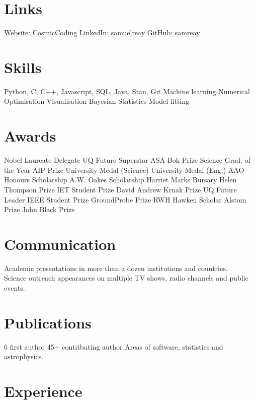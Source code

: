 \documentclass[]{friggeri-cv2}
\begin{document}
\pagestyle{plain}



\begin{aside}
\section{Links}
\href{https://cosmiccoding.com.au}{Website: CosmicCoding}
\href{https://www.linkedin.com/in/samuelreay/}{LinkedIn: samuelreay}
\href{https://github.com/samreay}{GitHub: samreay}
\section{Skills}
Python, C, C++, Javascript, SQL, Java, Stan, Git
Machine learning
Numerical Optimisation
Visualisation
Bayesian Statistics
Model fitting
\section{Awards}
Nobel Laureate Delegate
UQ Future Superstar
ASA Bok Prize
Science Grad. of the Year
AIP Prize
University Medal (Science)
University Medal (Eng.)
AAO Honours Scholarship
A.W. Oakes Scholarship
Harriet Marks Bursary
Helen Thompson Prize
IET Student Prize
David Andrew Krnak Prize
UQ Future Leader
IEEE Student Prize
GroundProbe Prize
RWH Hawken Scholar
Alstom Prize
John Black Prize
\section{Communication}
Academic presentations in more than a dozen institutions and countries.
~
Science outreach appearances on multiple TV shows, radio channels and public events.
\section{Publications}
6 first author
45+ contributing author
Areas of software, statistics and astrophysics.
\end{aside}


\section{Experience}
\end{document}
